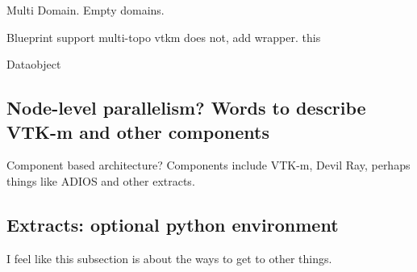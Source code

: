 Multi Domain. Empty domains.

Blueprint support multi-topo vtkm does not, add wrapper. this


Dataobject

\subsection{Node-level parallelism? Words to describe VTK-m and other components}

Component based architecture? Components include VTK-m, Devil Ray, perhaps things like ADIOS and other extracts.

%

\subsection{Extracts: optional python environment}
I feel like this subsection is about the ways to get to other things.

